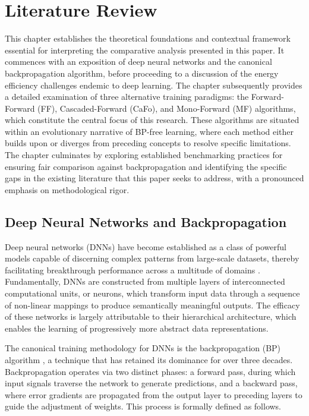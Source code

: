 \section{Literature Review}
\label{chap:background}

This chapter establishes the theoretical foundations and contextual framework essential for interpreting the comparative analysis presented in this paper. It commences with an exposition of deep neural networks and the canonical backpropagation algorithm, before proceeding to a discussion of the energy efficiency challenges endemic to deep learning. The chapter subsequently provides a detailed examination of three alternative training paradigms: the Forward-Forward (FF), Cascaded-Forward (CaFo), and Mono-Forward (MF) algorithms, which constitute the central focus of this research. These algorithms are situated within an evolutionary narrative of BP-free learning, where each method either builds upon or diverges from preceding concepts to resolve specific limitations. The chapter culminates by exploring established benchmarking practices for ensuring fair comparison against backpropagation and identifying the specific gaps in the existing literature that this paper seeks to address, with a pronounced emphasis on methodological rigor.

\subsection{Deep Neural Networks and Backpropagation}
\label{sec:dnn_bp}

Deep neural networks (DNNs) have become established as a class of powerful models capable of discerning complex patterns from large-scale datasets, thereby facilitating breakthrough performance across a multitude of domains \cite{goodfellow2016deep}. Fundamentally, DNNs are constructed from multiple layers of interconnected computational units, or neurons, which transform input data through a sequence of non-linear mappings to produce semantically meaningful outputs. The efficacy of these networks is largely attributable to their hierarchical architecture, which enables the learning of progressively more abstract data representations.

The canonical training methodology for DNNs is the backpropagation (BP) algorithm \cite{rumelhart1986learning}, a technique that has retained its dominance for over three decades. Backpropagation operates via two distinct phases: a forward pass, during which input signals traverse the network to generate predictions, and a backward pass, where error gradients are propagated from the output layer to preceding layers to guide the adjustment of weights. This process is formally defined as follows.

